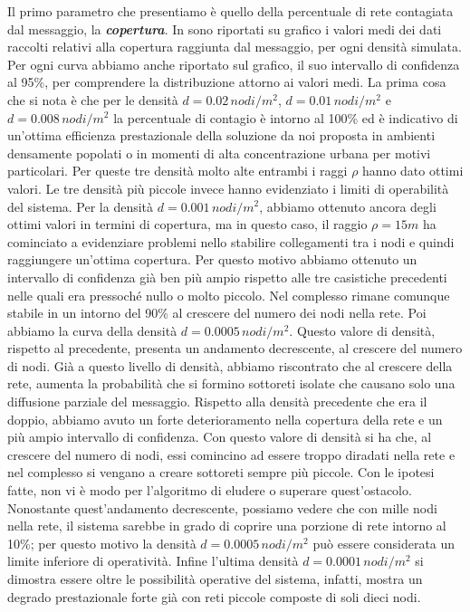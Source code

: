 Il primo parametro che presentiamo è quello della percentuale di rete contagiata dal messaggio, la \textbf{\textit{copertura}}. In  sono riportati su grafico i valori medi dei dati raccolti relativi alla copertura raggiunta dal messaggio, per ogni densità simulata. Per ogni curva abbiamo anche riportato sul grafico, il suo intervallo di confidenza al 95\%, per comprendere la distribuzione attorno ai valori medi. La prima cosa che si nota è che per le densità $d=0.02\, nodi/m^2$, $d=0.01\, nodi/m^2$ e $d=0.008\, nodi/m^2$ la percentuale di contagio è intorno al 100\% ed è indicativo di un'ottima efficienza prestazionale della soluzione da noi proposta in ambienti densamente popolati o in momenti di alta concentrazione urbana per motivi particolari. Per queste tre densità molto alte entrambi i raggi $\rho$ hanno dato ottimi valori. Le tre densità più piccole invece hanno evidenziato i limiti di operabilità del sistema. Per la densità $d=0.001\, nodi/m^2$, abbiamo ottenuto ancora degli ottimi valori in termini di copertura, ma in questo caso, il raggio $\rho=15m$ ha cominciato a evidenziare problemi nello stabilire collegamenti tra i nodi e quindi raggiungere un'ottima copertura. Per questo motivo abbiamo ottenuto un intervallo di confidenza già ben più ampio rispetto alle tre casistiche precedenti nelle quali era pressoché nullo o molto piccolo. Nel complesso rimane comunque stabile in un intorno del 90\% al crescere del numero dei nodi nella rete.
Poi abbiamo la curva della densità $d=0.0005\, nodi/m^2$. Questo valore di densità, rispetto al precedente, presenta un andamento decrescente, al crescere del numero di nodi. Già a questo livello di densità, abbiamo riscontrato che al crescere della rete, aumenta la probabilità che si formino sottoreti isolate che causano solo una diffusione parziale del messaggio. Rispetto alla densità precedente che era il doppio, abbiamo avuto un forte deterioramento nella copertura della rete e un più ampio intervallo di confidenza. Con questo valore di densità si ha che, al crescere del numero di nodi, essi comincino ad essere troppo diradati nella rete e nel complesso si vengano a creare sottoreti sempre più piccole. Con le ipotesi fatte, non vi è modo per l'algoritmo di eludere o superare quest'ostacolo. Nonostante quest'andamento decrescente, possiamo vedere che con mille nodi nella rete, il sistema sarebbe in grado di coprire una porzione di rete intorno al 10\%; per questo motivo la densità $d=0.0005\, nodi/m^2$ può essere considerata un limite inferiore di operatività. Infine l'ultima densità $d=0.0001\, nodi/m^2$ si dimostra essere oltre le possibilità operative del sistema, infatti, mostra un degrado prestazionale forte già con reti piccole composte di soli dieci nodi.
